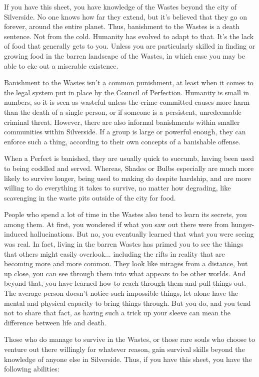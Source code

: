 \documentclass[blue]{Silversiders}
\begin{document}
\name{\bWastes{}}

If you have this sheet, you have knowledge of the Wastes beyond the city of Silverside. No one knows how far they extend, but it's believed that they go on forever, around the entire planet. Thus, banishment to the Wastes is a death sentence. Not from the cold. Humanity has evolved to adapt to that. It's the lack of food that generally gets to you. Unless you are particularly skilled in finding or growing food in the barren landscape of the Wastes, in which case you may be able to eke out a miserable existence.

Banishment to the Wastes isn't a common punishment, at least when it comes to the legal system put in place by the Council of Perfection. Humanity is small in numbers, so it is seen as wasteful unless the crime committed causes more harm than the death of a single person, or if someone is a persistent, unredeemable criminal threat. However, there are also informal banishments within smaller communities within Silverside. If a group is large or powerful enough, they can enforce such a thing, according to their own concepts of a banishable offense.

When a Perfect is banished, they are usually quick to succumb, having been used to being coddled and served. Whereas, Shades or Bulbs especially are much more likely to survive longer, being used to making do despite hardship, and are more willing to do everything it takes to survive, no matter how degrading, like scavenging in the waste pits outside of the city for food.

People who spend a lot of time in the Wastes also tend to learn its secrets, you among them. At first, you wondered if what you saw out there were from hunger-induced hallucinations. But no, you eventually learned that what you were seeing was real. In fact, living in the barren Wastes has primed you to see the things that others might easily overlook... including the rifts in reality that are becoming more and more common. They look like mirages from a distance, but up close, you can see through them into what appears to be other worlds. And beyond that, you have learned how to reach through them and pull things out. The average person doesn't notice such impossible things, let alone have the mental and physical capacity to bring things through. But you do, and you tend not to share that fact, as having such a trick up your sleeve can mean the difference between life and death.

Those who do manage to survive in the Wastes, or those rare souls who choose to venture out there willingly for whatever reason, gain survival skills beyond the knowledge of anyone else in Silverside. Thus, if you have this sheet, you have the following abilities:

\begin{itemz}
	\item \aFirstAid{}
	\item \aTough{}
	\item \aScavenge{}
\end{itemz}
\end{document}
